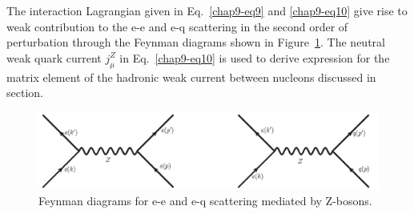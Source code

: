 The interaction Lagrangian given in Eq.~\ref{chap9-eq9} and \ref{chap9-eq10} give rise to weak contribution to the e-e and e-q scattering in the second order of perturbation through the Feynman diagrams shown in Figure~\ref{chap9-fig2}. The neutral weak quark current $j^Z_\mu$ in Eq.~\ref{chap9-eq10} is used to derive expression for the matrix element of the hadronic weak current between nucleons discussed in section.
\medskip

\begin{figure}[H]
\centering
\includegraphics[scale=0.35]{src/images/chap9/ee_eq.jpg}
\caption{Feynman diagrams for e-e and e-q scattering mediated by Z-bosons.}\label{chap9-fig2}
\end{figure}
  
